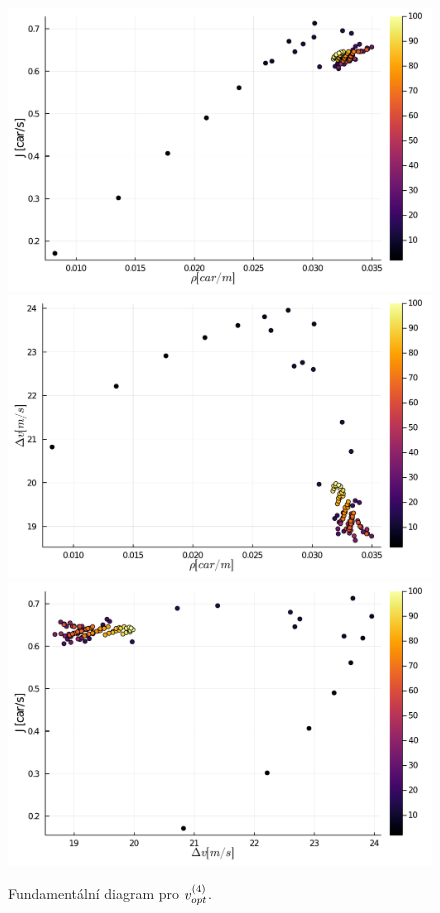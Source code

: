\documentclass[a4paper, 12pt, fleqn]{article}
\begin{document}
\begin{figure}
	\centering
	\begin{minipage}[c]{0.7\textwidth}
		\centering
		\vspace*{\fill}
		\includegraphics[width=\textwidth]{images/FD_RJ_vopt3.pdf}
		\includegraphics[width=\textwidth]{images/FD_RV_vopt3.pdf}
		\includegraphics[width=\textwidth]{images/FD_VJ_vopt3.pdf}
	\end{minipage}
	\caption{Fundamentální diagram pro $v_{opt}^{(4)}$.}
	\label{Obr: FD vopt4}
\end{figure}
\end{document}
